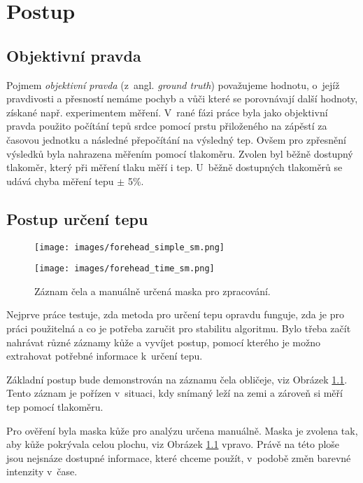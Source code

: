 \documentclass[
  digital, %
  table,   %
%
  lof,     %
  lot,     %
]{fithesis3}
\begin{document}
\chapter{Postup}
\section{Objektivní pravda}
Pojmem \emph{objektivní pravda} (z~angl. \emph{ground truth}) považujeme hodnotu, o~jejíž pravdivosti a přesností nemáme pochyb a vůči které se porovnávají další hodnoty, získané např. experimentem měření. V~rané fázi práce byla jako objektivní pravda použito počítání tepů srdce pomocí prstu přiloženého na zápěstí za časovou jednotku a následné přepočítání na výsledný tep. Ovšem pro zpřesnění výsledků byla nahrazena měřením pomocí tlakoměru. Zvolen byl běžně dostupný tlakoměr, který při měření tlaku měří i tep. U~běžně dostupných tlakoměrů se udává chyba měření tepu $\pm$ 5\%.

\section{Postup určení tepu}
\label{sec:detect-pulse}
\begin{figure}[t]
  \begin{minipage}{.5\textwidth}
    \texttt{[image: images/forehead\_simple\_sm.png]}
  \end{minipage}
  \begin{minipage}{.5\textwidth}
    \texttt{[image: images/forehead\_time\_sm.png]}
  \end{minipage}
  \caption{Záznam čela a manuálně určená maska pro zpracování.}
  \label{fig:initial-proof-forehead}
\end{figure}
Nejprve práce testuje, zda metoda pro určení tepu opravdu funguje, zda je pro práci použitelná a co je potřeba zaručit pro stabilitu algoritmu. Bylo třeba začít nahrávat různé záznamy kůže a vyvíjet postup, pomocí kterého je možno extrahovat potřebné informace k~určení tepu.

Základní postup bude demonstrován na záznamu čela obličeje, viz Obrázek \ref{fig:initial-proof-forehead}. Tento záznam je pořízen v~situaci, kdy snímaný leží na zemi a zároveň si měří tep pomocí tlakoměru.

Pro ověření byla maska kůže pro analýzu určena manuálně. Maska je zvolena tak, aby kůže pokrývala celou plochu, viz Obrázek \ref{fig:initial-proof-forehead} vpravo. Právě na této ploše jsou nejsnáze dostupné informace, které chceme použít, v~podobě změn barevné intenzity v~čase. %
\end{document}

